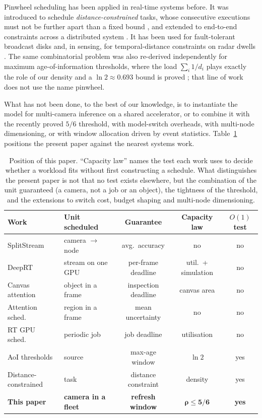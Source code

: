 \documentclass[final,5p,times,twocolumn]{elsarticle}
\theoremstyle{definition}
\newcommand{\dens}{\rho}
\begin{document}
Pinwheel scheduling has been applied in real-time systems before. It was introduced to
schedule \emph{distance-constrained} tasks, whose consecutive executions must not be further
apart than a fixed bound \cite{han1992distance,han1996distance}, and extended to end-to-end
constraints across a distributed system \cite{hsueh2001distributed}. It has been used for
fault-tolerant broadcast disks \cite{baruah1997broadcast} and, in sensing, for temporal-distance
constraints on radar dwells \cite{gopalakrishnan2006radar}. The same combinatorial problem was
also re-derived independently for maximum age-of-information thresholds, where the load
$\sum_i 1/d_i$ plays exactly the role of our density and a $\ln 2\approx0.693$ bound is proved
\cite{li2020aoi,li2022aoi}; that line of work does not use the name pinwheel.

What has not been done, to the best of our knowledge, is to instantiate the model for
multi-camera inference on a shared accelerator, or to combine it with the recently proved $5/6$
threshold, with model-switch overheads, with multi-node dimensioning, or with window allocation
driven by event statistics. Table~\ref{tab:related} positions the present paper against the
nearest systems work.

\begin{table}[t]
\centering\small
\caption{Position of this paper. ``Capacity law'' names the test each work uses to decide
whether a workload fits without first constructing a schedule. What distinguishes the present
paper is not that no test exists elsewhere, but the combination of the unit guaranteed (a camera,
not a job or an object), the tightness of the threshold, and the extensions to switch cost,
budget shaping and multi-node dimensioning.}
\label{tab:related}
\footnotesize\setlength{\tabcolsep}{4pt}
\begin{tabular}{llccc}
\toprule
Work & Unit scheduled & Guarantee & Capacity law & $O(1)$ test \\
\midrule
SplitStream \cite{liang2024splitstream} & camera $\to$ node & avg.\ accuracy & no & no \\
DeepRT \cite{yang2021deeprt} & stream on one {GPU} & per-frame deadline & util.\ + simulation & no \\
Canvas attention \cite{hu2024canvas} & object in a frame & inspection deadline & canvas area & no \\
Attention sched.\ \cite{liu2023attention} & region in a frame & mean uncertainty & no & no \\
RT GPU sched.\ \cite{zou2023rtgpu} & periodic job & job deadline & utilisation & no \\
{AoI} thresholds \cite{li2020aoi} & source & max-age window & $\ln 2$ & yes \\
Distance-constrained \cite{han1996distance} & task & distance constraint & density & yes \\
\textbf{This paper} & \textbf{camera in a fleet} & \textbf{refresh window} & $\bm{\dens\le5/6}$ & \textbf{yes} \\
\bottomrule
\end{tabular}
\end{table}
\end{document}
